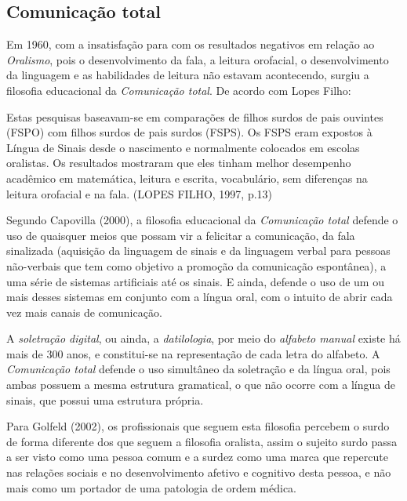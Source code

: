 \documentclass[brasil]{abnt}
\begin{document}
		\subsection{Comunicação total}
		Em 1960, com a insatisfação para com os resultados negativos em relação ao \textit{Oralismo}, pois o desenvolvimento da fala, a leitura orofacial, o desenvolvimento da linguagem e as habilidades de 
		leitura não estavam acontecendo, surgiu a filosofia educacional da \textit{Comunicação total}. De acordo com Lopes Filho:
		
			\begin{citacao} Estas pesquisas baseavam-se em comparações de filhos surdos de pais ouvintes (FSPO) com filhos surdos de pais surdos (FSPS). Os FSPS eram expostos à Língua de Sinais desde o 
							nascimento e normalmente colocados em escolas oralistas. Os resultados mostraram que eles tinham melhor desempenho acadêmico em matemática, leitura e escrita, vocabulário, sem 
							diferenças na leitura orofacial e na fala. (LOPES FILHO, 1997, p.13)
			\end{citacao}
		  
		 Segundo Capovilla (2000), a filosofia educacional da \textit{Comunicação total} defende o uso de quaisquer meios que possam vir a felicitar a comunicação, da fala sinalizada (aquisição da linguagem 
		 de sinais e da linguagem verbal para pessoas não-verbais que tem como objetivo a promoção da comunicação espontânea), a uma série de sistemas artificiais até os sinais. E ainda, defende o uso de um 
		 ou mais desses sistemas em conjunto com a língua oral, com o intuito de abrir cada vez mais canais de comunicação.
		 
		 A \textit{soletração digital}, ou ainda, a \textit{datilologia}, por meio do \textit{alfabeto manual} existe há mais de 300 anos, e constitui-se na representação de cada letra do alfabeto. 
		 A \textit{Comunicação total} defende o uso simultâneo da soletração e da língua oral, pois ambas possuem a mesma estrutura gramatical, o que não ocorre com a língua de sinais, que possui uma estrutura
		 própria.  
		
		 Para Golfeld (2002), os profissionais que seguem esta filosofia percebem o surdo de forma diferente dos que seguem a filosofia oralista, assim o sujeito surdo passa a ser visto como uma pessoa comum 
		 e a surdez como uma marca que repercute nas relações sociais e no desenvolvimento afetivo e cognitivo desta pessoa, e não mais como um portador de uma patologia de ordem médica.
		 
\end{document}
